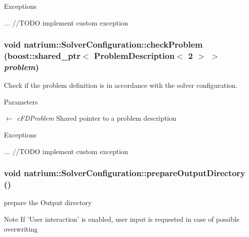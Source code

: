 \begin{DoxyExceptions}{Exceptions}
\item[{\em ...}]//TODO implement custom exception \end{DoxyExceptions}
\hypertarget{classnatrium_1_1SolverConfiguration_acc8235baf17f3178be1baf6bd82b35a6}{
\subsubsection[{checkProblem}]{\setlength{\rightskip}{0pt plus 5cm}void natrium::SolverConfiguration::checkProblem (boost::shared\_\-ptr$<$ {\bf ProblemDescription}$<$ 2 $>$ $>$ {\em problem})}}
\label{classnatrium_1_1SolverConfiguration_acc8235baf17f3178be1baf6bd82b35a6}


Check if the problem definition is in accordance with the solver configuration. 
\begin{DoxyParams}{Parameters}
\item[\mbox{$\leftarrow$} {\em cFDProblem}]Shared pointer to a problem description\end{DoxyParams}

\begin{DoxyExceptions}{Exceptions}
\item[{\em ...}]//TODO implement custom exception \end{DoxyExceptions}
\hypertarget{classnatrium_1_1SolverConfiguration_a69c009fd87690677b66ab10a000d07f6}{
\subsubsection[{prepareOutputDirectory}]{\setlength{\rightskip}{0pt plus 5cm}void natrium::SolverConfiguration::prepareOutputDirectory ()}}
\label{classnatrium_1_1SolverConfiguration_a69c009fd87690677b66ab10a000d07f6}


prepare the Output directory \begin{DoxyNote}{Note}
If 'User interaction' is enabled, user input is requested in case of possible overwriting 
\end{DoxyNote}

